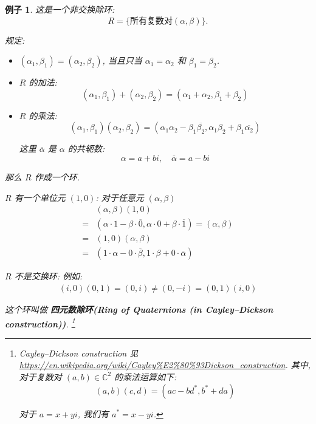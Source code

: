 \documentclass[utf8]{ctexbook}
\newtheorem{example}{例子}[section]
\begin{document}
\begin{example}
这是一个非交换除环:
\begin{equation}
R = \{ \mbox{所有复数对} (\alpha, \beta) \} .
\end{equation}

规定:
\begin{itemize}
\item{$(\alpha_1, \beta_1 ) = (\alpha_2, \beta_2 )$, 当且只当 $ \alpha_1 = \alpha_2$ 和 $\beta_1 = \beta_2 $.}
\item{$R$ 的加法:
\begin{equation}
(\alpha_1, \beta_1) + (\alpha_2, \beta_2) = (\alpha_1 + \alpha_2, \beta_1 + \beta_2)
\end{equation}
}
\item{$R$ 的乘法:
\begin{equation}
(\alpha_1, \beta_1) (\alpha_2, \beta_2) = ( \alpha_1 \alpha_2 - \beta_1 \overline{\beta_2}, \alpha_1 \beta_2 + \beta_1 \overline{\alpha_2} )
\end{equation}

这里 $\overline{\alpha}$ 是 $\alpha$ 的共轭数:
\begin{equation}
\alpha = a + b i , \quad \overline{\alpha} = a - b i
\end{equation}
}
\end{itemize}

那么 $R$ 作成一个环. 

$R$ 有一个单位元 $(1, 0)$: 对于任意元 $(\alpha, \beta)$
\begin{align*}
& (\alpha, \beta) (1, 0) \\
= & ( \alpha \cdot 1 - \beta \cdot \overline{0}, \alpha \cdot 0 + \beta \cdot \overline{1} ) = (\alpha, \beta) \\
= & (1, 0)  (\alpha, \beta) \\
= & ( 1 \cdot \alpha - 0 \cdot \overline{\beta}, 1 \cdot \beta + 0 \cdot \overline{\alpha} )
\end{align*}

$R$ 不是交换环: 例如:
\begin{align*}
(i, 0) (0, 1) = (0, i) \neq (0, -i) = (0, 1) (i, 0)
\end{align*}

这个环叫做 \textbf{四元数除环(Ring of Quaternions (in Cayley–Dickson construction))}. \footnote{Cayley–Dickson construction 见 \url{https://en.wikipedia.org/wiki/Cayley\%E2\%80\%93Dickson\_construction}. 其中, 对于复数对 $(a, b) \in \mathbb{C}^2$ 的乘法运算如下:
\begin{equation}
(a,b)(c,d) = (ac - bd^*, b^* + da)
\end{equation}

对于 $a= x + y i$, 我们有 $a^* = x - yi$.
}
\end{example}
\end{document}
